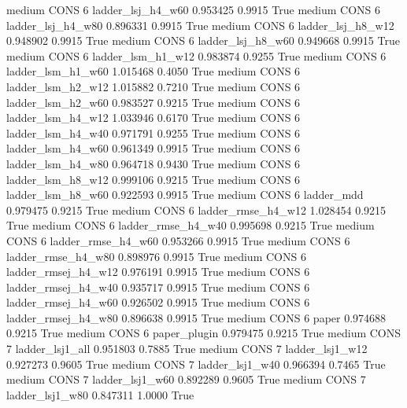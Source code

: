     medium     CONS                 6   ladder_lsj_h4_w60   0.953425      0.9915    True
    medium     CONS                 6   ladder_lsj_h4_w80   0.896331      0.9915    True
    medium     CONS                 6   ladder_lsj_h8_w12   0.948902      0.9915    True
    medium     CONS                 6   ladder_lsj_h8_w60   0.949668      0.9915    True
    medium     CONS                 6   ladder_lsm_h1_w12   0.983874      0.9255    True
    medium     CONS                 6   ladder_lsm_h1_w60   1.015468      0.4050    True
    medium     CONS                 6   ladder_lsm_h2_w12   1.015882      0.7210    True
    medium     CONS                 6   ladder_lsm_h2_w60   0.983527      0.9215    True
    medium     CONS                 6   ladder_lsm_h4_w12   1.033946      0.6170    True
    medium     CONS                 6   ladder_lsm_h4_w40   0.971791      0.9255    True
    medium     CONS                 6   ladder_lsm_h4_w60   0.961349      0.9915    True
    medium     CONS                 6   ladder_lsm_h4_w80   0.964718      0.9430    True
    medium     CONS                 6   ladder_lsm_h8_w12   0.999106      0.9215    True
    medium     CONS                 6   ladder_lsm_h8_w60   0.922593      0.9915    True
    medium     CONS                 6          ladder_mdd   0.979475      0.9215    True
    medium     CONS                 6  ladder_rmse_h4_w12   1.028454      0.9215    True
    medium     CONS                 6  ladder_rmse_h4_w40   0.995698      0.9215    True
    medium     CONS                 6  ladder_rmse_h4_w60   0.953266      0.9915    True
    medium     CONS                 6  ladder_rmse_h4_w80   0.898976      0.9915    True
    medium     CONS                 6 ladder_rmsej_h4_w12   0.976191      0.9915    True
    medium     CONS                 6 ladder_rmsej_h4_w40   0.935717      0.9915    True
    medium     CONS                 6 ladder_rmsej_h4_w60   0.926502      0.9915    True
    medium     CONS                 6 ladder_rmsej_h4_w80   0.896638      0.9915    True
    medium     CONS                 6               paper   0.974688      0.9215    True
    medium     CONS                 6        paper_plugin   0.979475      0.9215    True
    medium     CONS                 7     ladder_lsj1_all   0.951803      0.7885    True
    medium     CONS                 7     ladder_lsj1_w12   0.927273      0.9605    True
    medium     CONS                 7     ladder_lsj1_w40   0.966394      0.7465    True
    medium     CONS                 7     ladder_lsj1_w60   0.892289      0.9605    True
    medium     CONS                 7     ladder_lsj1_w80   0.847311      1.0000    True
